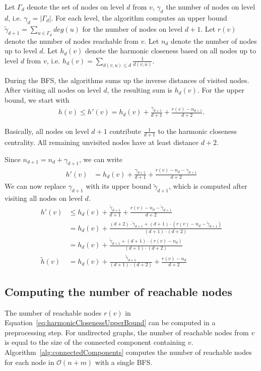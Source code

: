 Let $\Gamma_d$ denote the set of nodes on level $d$ from $v$, $\gamma_d$ the number of nodes on level $d$, i.e. $\gamma_d = |\Gamma_d|$. For each level, the algorithm computes an upper bound $\widetilde{\gamma}_{d+1} = \sum_{u \in \Gamma_d}{deg(u)}$ for the number of nodes on level $d + 1$. Let $r(v)$ denote the number of nodes reachable from $v$. Let $n_d$ denote the number of nodes up to level $d$. Let $h_d(v)$ denote the harmonic closeness based on all nodes up to level $d$ from $v$, i.e. $h_d(v) = \sum_{d(v, u) \leq d}{\frac{1}{d(v, u)}}$.

During the BFS, the algorithms sums up the inverse distances of visited nodes. After visiting all nodes on level $d$, the resulting sum is $h_d(v)$. For the upper bound, we start with
\begin{align}
	h(v) \leq h'(v) = h_d(v) + \frac{\gamma_{d+1}}{d+1} + \frac{r(v) - n_{d+1}}{d+2}.
\end{align}

Basically, all nodes on level $d + 1$ contribute $\frac{1}{d+1}$ to the harmonic closeness centrality. All remaining unvisited nodes have at least distance $d + 2$.

Since $n_{d + 1} = n_d + \gamma_{d+1}$, we can write
\begin{align}
	         h'(v)   &= h_d(v) + \frac{\gamma_{d+1}}{d+1} + \frac{r(v) - n_{d} - \gamma_{d+1}}{d+2}
\end{align}
We can now replace $\gamma_{d+1}$ with its upper bound $\widetilde{\gamma}_{d+1}$, which is computed after visiting all nodes on level $d$.
\begin{align}
	          h'(v)  &\leq h_d(v) + \frac{\widetilde{\gamma}_{d+1}}{d+1} + \frac{r(v) - n_{d} - \widetilde{\gamma}_{d+1}}{d+2} \label{eq:harmonicClosenessEstimate} \\
	                 &= h_d(v) + \frac{(d + 2) \cdot \widetilde{\gamma}_{d+1} + (d+1) \cdot \left(r(v) - n_{d} - \widetilde{\gamma}_{d+1}\right)}{(d+1) \cdot (d+2)} \\
	                 &= h_d(v) + \frac{\widetilde{\gamma}_{d+1} + (d+1) \cdot \left(r(v) - n_{d} \right)}{(d+1) \cdot (d+2)} \\
  \widetilde{h}(v)   &= h_d(v) + \frac{\widetilde{\gamma}_{d+1}}{(d+1) \cdot (d+2)} + \frac{r(v) - n_{d}}{d+2} \label{eq:harmonicClosenessUpperBound}
  \end{align}

\subsection{Computing the number of reachable nodes}
\label{sec:reachableNodes}
The number of reachable nodes $r(v)$ in Equation~\ref{eq:harmonicClosenessUpperBound} can be computed in a preprocessing step. For undirected graphs, the number of reachable nodes from $v$ is equal to the size of the connected component containing $v$. Algorithm~\ref{alg:connectedComponents} computes the number of reachable nodes for each node in $\mathcal{O}(n + m)$ with a single BFS.

